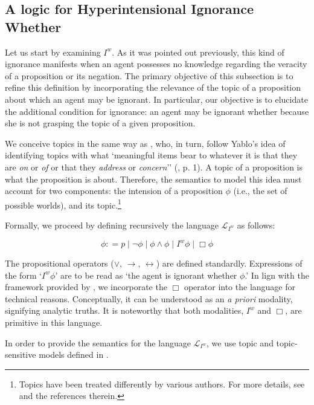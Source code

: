 \documentclass{article}
\begin{document}
\subsection{A logic for Hyperintensional Ignorance Whether}
\label{HIWsubsection}

Let us start by examining $I^{w}$. As it was pointed out previously, this kind of ignorance manifests when an agent possesses no knowledge regarding the veracity of a proposition or its negation. The primary objective of this subsection is to refine this definition by incorporating the relevance of the topic of a proposition about which an agent may be ignorant. In particular, our objective is to elucidate the additional condition for ignorance: an agent may be ignorant whether because she is not grasping the topic of a given proposition. 

We conceive topics in the same way as \cite{Ozgun2020}, who, in turn, follow Yablo's idea of identifying topics with what `meaningful items bear to whatever it is that they are \textit{on} or \textit{of} or that they \textit{address} or \textit{concern}'' (\cite{Yablo2014}, p. 1). A topic of a proposition is what the proposition is about. Therefore, the semantics to model this idea must account for two components: the intension of a proposition $\phi$ (i.e., the set of possible worlds), and its topic.\footnote{Topics have been treated differently by various authors. For more details, see \citep{Ozgun2020} and the references therein.}

Formally, we proceed by defining recursively the language $\mathcal{L}_{I^{w}}$ as follows:

$$ \phi : = p \mid \neg \phi \mid \phi \wedge \phi \mid I^{w} \phi \mid \Box \phi$$

The propositional operators ($\vee$, $\rightarrow$, $\leftrightarrow$) are defined standardly. Expressions of the form `$I^{w}\phi$' are to be read as `the agent is ignorant whether $\phi$.' In lign with the framework provided by \citet{Ozgun2023}, we incorporate the $\Box$ operator into the language for technical reasons. Conceptually, it can be understood as an \textit{a priori} modality, signifying analytic truths. It is noteworthy that both modalities, $I^{w}$ and $\Box$, are primitive in this language.

In order to provide the semantics for the language $\mathcal{L}_{I^{w}}$, we use topic and topic-sensitive models defined in \citep[Definitions 1,2]{Ozgun2023}.
\end{document}

